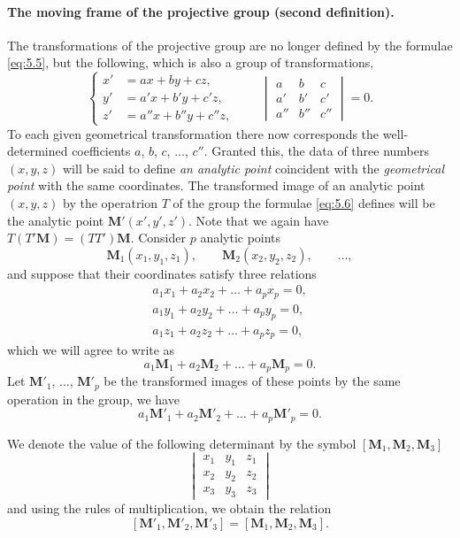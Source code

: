 \documentclass[leqno,11pt]{book}
\numberwithin{equation}{chapter}
\theoremstyle{shape1}
\theoremstyle{shapesmall}
\begin{document}
\paragraph{The moving frame of the projective group (second definition).}
\label{sec:67}
The transformations of the projective group are no longer defined by the formulae \eqref{eq:5.5}, but the following, which is also a group of transformations,
\begin{equation}
  \label{eq:5.6}
  \left\{
    \begin{aligned}
      x'&=ax+by+cz,\\
      y'&=a'x+b'y+c'z,\\
      z'&=a''x+b''y+c''z,
    \end{aligned}
  \right.\qquad
  \begin{vmatrix}
    a&b&c\\
    a'&b'&c'\\
    a''&b''&c''
  \end{vmatrix}
  =0.
\end{equation}
To each given geometrical transformation there now corresponds the well-determined coefficients $a$, $b$, $c$, $\dots$, $c''$. Granted this, the data of three numbers $(x,y,z)$ will be said to define \emph{an analytic point} coincident with the \emph{geometrical point} with the same coordinates. The transformed image of an analytic point $(x,y,z)$ by the operatrion $T$ of the group the formulae \eqref{eq:5.6} defines will be the analytic point $\mathbf{M}'(x',y',z')$. Note that we again have $T(T'\mathbf{M})=(TT')\mathbf{M}$. Consider $p$ analytic points
\[
\mathbf{M}_{1}(x_{1},y_{1},z_{1}),\qquad \mathbf{M}_{2}(x_{2},y_{2},z_{2}),\qquad\dots,
\] 
and suppose that their coordinates satisfy three relations
\begin{align*}
  a_{1}x_{1}+a_{2}x_{2}+\dots+a_{p}x_{p}=0,\\
  a_{1}y_{1}+a_{2}y_{2}+\dots+a_{p}y_{p}=0,\\
  a_{1}z_{1}+a_{2}z_{2}+\dots+a_{p}z_{p}=0,
\end{align*}
which we will agree to write as
\[
  a_{1}\mathbf{M}_{1}+a_{2}\mathbf{M}_{2}+\dots+a_{p}\mathbf{M}_{p}=0.
\]
Let $\mathbf{M}'_{1}$, $\dots$, $\mathbf{M}'_{p}$ be the transformed images of these points by the same operation in the group, we have
\[
  a_{1}\mathbf{M}'_{1}+a_{2}\mathbf{M}'_{2}+\dots+a_{p}\mathbf{M}'_{p}=0.
\]

We denote the value of the following determinant by the symbol $[\mathbf{M}_{1},\mathbf{M}_{2},\mathbf{M}_{3}]$
\[
\begin{vmatrix}
  x_{1}&y_{1}&z_{1}\\
  x_{2}&y_{2}&z_{2}\\
  x_{3}&y_{3}&z_{3}
\end{vmatrix}
\]
and using the rules of multiplication, we obtain the relation
\[
[\mathbf{M}'_{1},\mathbf{M}'_{2},\mathbf{M}'_{3}]=[\mathbf{M}_{1},\mathbf{M}_{2},\mathbf{M}_{3}].
\]
\end{document}
